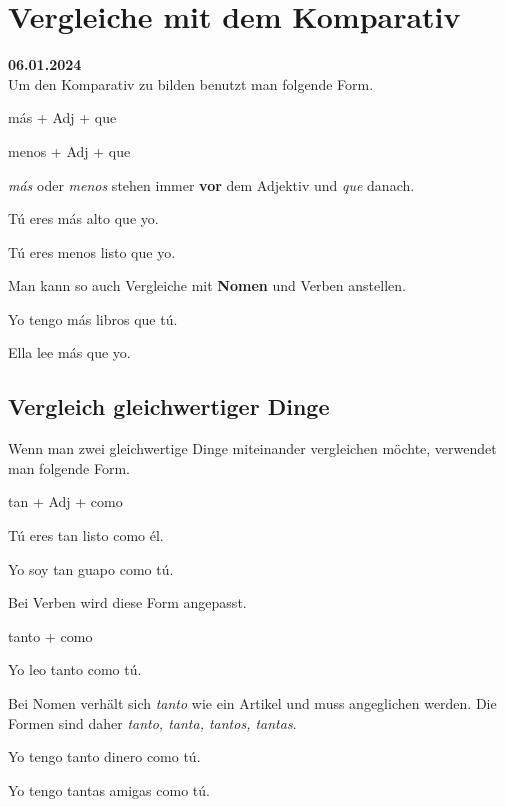 \section{Vergleiche mit dem Komparativ}
\textbf{06.01.2024}\\
Um den Komparativ zu bilden benutzt man folgende Form.
\begin{gramatica}
    \item m\'as + Adj + que
    \item menos + Adj + que
\end{gramatica}
\textit{m\'as} oder \textit{menos} stehen immer \textbf{vor}
dem Adjektiv und \textit{que} danach.
\begin{ejemplos}
    \item T\'u eres m\'as alto que yo.
    \item T\'u eres menos listo que yo.
\end{ejemplos}
Man kann so auch Vergleiche mit \textbf{Nomen} und Verben
anstellen.
\begin{ejemplos}
    \item Yo tengo m\'as libros que t\'u.
    \item Ella lee m\'as que yo.
\end{ejemplos}
\subsection*{Vergleich gleichwertiger Dinge}
Wenn man zwei gleichwertige Dinge miteinander vergleichen
möchte, verwendet man folgende Form.
\begin{gramatica}
    \item tan + Adj + como
\end{gramatica}
\begin{ejemplos}
    \item T\'u eres tan listo como \'el.
    \item Yo soy tan guapo como t\'u.
\end{ejemplos}
Bei Verben wird diese Form angepasst.
\begin{gramatica}
    \item tanto + como
\end{gramatica}
\begin{ejemplos}
    \item Yo leo tanto como t\'u.
\end{ejemplos}
Bei Nomen verhält sich \textit{tanto} wie ein Artikel und muss
angeglichen werden. Die Formen sind daher 
\textit{tanto, tanta, tantos, tantas}.
\begin{ejemplos}
    \item Yo tengo tanto dinero como t\'u.
    \item Yo tengo tantas amigas como t\'u.
\end{ejemplos}
